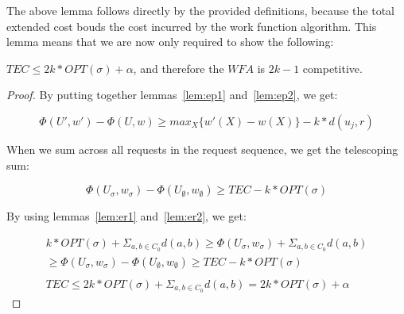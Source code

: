 The above lemma follows directly by the provided definitions, because the total extended cost bouds the cost incurred by the work function algorithm. This lemma means that we are now only required to show the following:

\begin{lemma}
    $TEC \leq 2k * OPT(\sigma) + \alpha$, and therefore the $WFA$ is $2k-1$ competitive.
\end{lemma}

\begin{proof}
    By putting together lemmas~\ref{lem:ep1} and~\ref{lem:ep2}, we get:

    \begin{equation*}
        \Phi(U', w') - \Phi(U, w) \geq max_X\{ w'(X) - w(X)\} -k * d(u_j, r)
    \end{equation*}

    When we sum across all requests in the request sequence, we get the telescoping sum:

    \begin{equation*}
        \Phi(U_\sigma, w_\sigma) - \Phi(U_\emptyset, w_\emptyset) \geq TEC - k*OPT(\sigma)
    \end{equation*}

    By using lemmas~\ref{lem:er1} and~\ref{lem:er2}, we get:

    \begin{equation*}
        \begin{gathered}
            k * OPT(\sigma)+ \Sigma_{a, b \in C_0} d(a, b) \geq \Phi(U_\sigma, w_\sigma) + \Sigma_{a, b \in C_0} d(a, b) \\
            \geq \Phi(U_\sigma, w_\sigma) - \Phi(U_\emptyset, w_\emptyset) \geq TEC - k*OPT(\sigma)\\ \\
            TEC \leq 2k * OPT(\sigma) + \Sigma_{a, b \in C_0} d(a, b) = 2k * OPT(\sigma) + \alpha
        \end{gathered}
    \end{equation*}
\end{proof}
